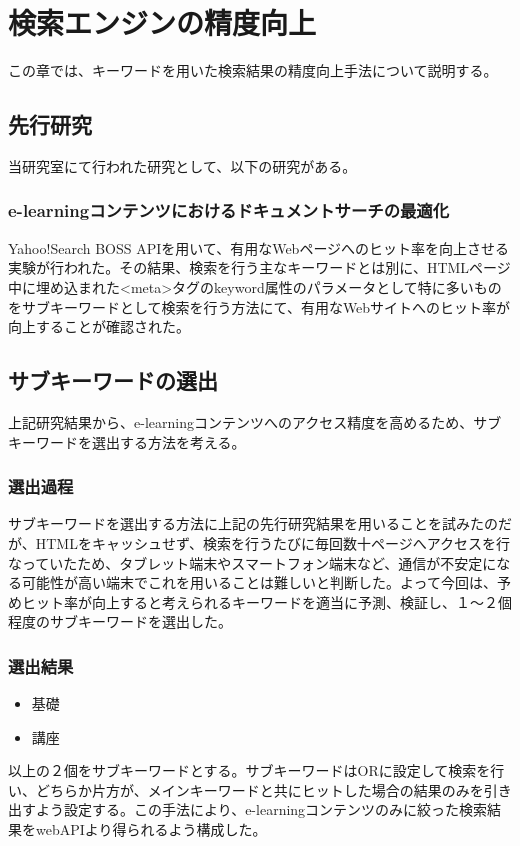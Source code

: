 \chapter{検索エンジンの精度向上}
\label{chap:search}

この章では、キーワードを用いた検索結果の精度向上手法について説明する。

\section{先行研究}
当研究室にて行われた研究として、以下の研究がある。

\subsection{e-learningコンテンツにおけるドキュメントサーチの最適化\cite{docsearch}}
Yahoo!Search BOSS APIを用いて、有用なWebページへのヒット率を向上させる実験が行われた。その結果、検索を行う主なキーワードとは別に、HTMLページ中に埋め込まれた<meta>タグのkeyword属性のパラメータとして特に多いものをサブキーワードとして検索を行う方法にて、有用なWebサイトへのヒット率が向上することが確認された。

\section{サブキーワードの選出}
上記研究結果から、e-learningコンテンツへのアクセス精度を高めるため、サブキーワードを選出する方法を考える。

\subsection{選出過程}
サブキーワードを選出する方法に上記の先行研究結果を用いることを試みたのだが、HTMLをキャッシュせず、検索を行うたびに毎回数十ページへアクセスを行なっていたため、タブレット端末やスマートフォン端末など、通信が不安定になる可能性が高い端末でこれを用いることは難しいと判断した。よって今回は、予めヒット率が向上すると考えられるキーワードを適当に予測、検証し、１〜２個程度のサブキーワードを選出した。

\subsection{選出結果}
\begin{itemize}
\item 基礎
\item 講座
\end{itemize}
以上の２個をサブキーワードとする。サブキーワードはORに設定して検索を行い、どちらか片方が、メインキーワードと共にヒットした場合の結果のみを引き出すよう設定する。この手法により、e-learningコンテンツのみに絞った検索結果をwebAPIより得られるよう構成した。